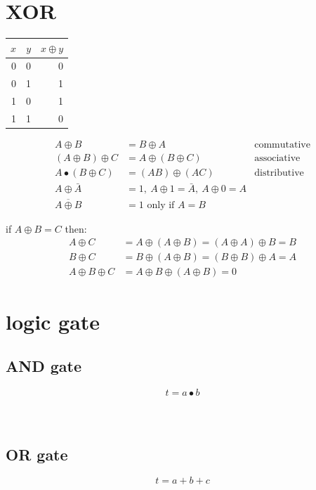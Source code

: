 \documentclass[a4paper,12pt]{article}
\begin{document}
\section{XOR}
\label{sec:orgf13d9a5}
\begin{tabular}{rrr}
\(x\) & \(y\) & \(x \oplus y\)\\
\hline
0 & 0 & 0\\
0 & 1 & 1\\
1 & 0 & 1\\
1 & 1 & 0\\
\end{tabular}
\begin{characteristic}
\begin{align}
  A \oplus B &= B \oplus A & \text{commutative}\\
  (A \oplus B) \oplus C &= A \oplus (B \oplus C) & \text{associative}\\
  A \bullet (B \oplus C) &= (AB) \oplus (AC) & \text{distributive}\\
  A \oplus \bar{A} &= 1,\ A \oplus 1 = \bar{A},\ A \oplus 0 = A\\
  \overline{A \oplus B} &= 1 \text{ only if } A = B
\end{align}
\end{characteristic}
\begin{characteristic}
if \(A \oplus B = C\) then:\\
\begin{align*}
  A \oplus C &= A \oplus (A \oplus B) = (A \oplus A) \oplus B = B\\
  B \oplus C &= B \oplus (A \oplus B) = (B \oplus B) \oplus A = A\\
  A \oplus B \oplus C &= A \oplus B \oplus (A \oplus B) = 0
\end{align*}
\end{characteristic}
\section{logic gate}
\label{sec:org182e608}
\subsection{AND gate}
\label{sec:orged54c3e}
\[
  t = a \bullet b
\]\\
\\

\subsection{OR gate}
\label{sec:org3113977}
\[
  t = a + b + c
\]\\
\\
\end{document}
